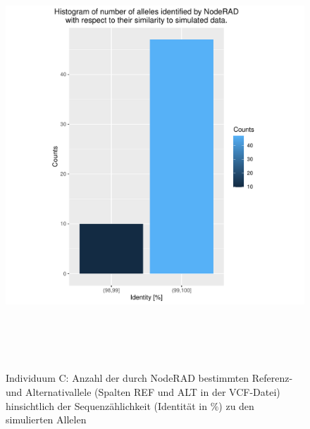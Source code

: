 \begin{figure}[H]
	\begin{center}
		\includegraphics[height=16cm]{bilder/evaluation/hist_perc_ident/C.plot_hist.pdf}
		\caption{Individuum C: Anzahl der durch NodeRAD bestimmten Referenz- und Alternativallele (Spalten REF und ALT in der VCF-Datei) hinsichtlich der Sequenzählichkeit (Identität in $ \% $) zu den simulierten Allelen}
	\end{center}
\end{figure}

